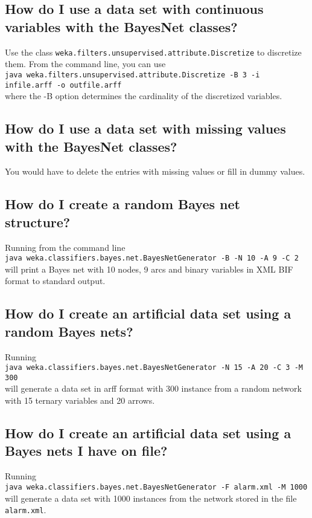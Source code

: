 \documentclass{article}
\begin{document}
\subsection*{How do I use a data set with continuous variables with the BayesNet classes?}
Use the class {\tt weka.filters.unsupervised.attribute.Discretize} to discretize them.
From the command line, you can use\\
{\tt java weka.filters.unsupervised.attribute.Discretize -B 3 -i infile.arff -o outfile.arff}\\
where the -B option determines the cardinality of the discretized variables.

\subsection*{How do I use a data set with missing values with the BayesNet classes?}
You would have to delete the entries with missing values or
fill in dummy values.

\subsection*{How do I create a random Bayes net structure?}

Running from the command line \\
{\tt java  weka.classifiers.bayes.net.BayesNetGenerator -B -N 10 -A 9 -C 2}\\
will print a Bayes net with 10 nodes, 9 arcs and binary variables
in XML BIF format to standard output.

\subsection*{How do I create an artificial data set using a random Bayes nets?}
Running\\
{\tt java  weka.classifiers.bayes.net.BayesNetGenerator -N 15 -A 20 -C 3 -M 300}\\
will generate a data set in arff format with 300 instance from a random
network with 15 ternary variables and 20 arrows.

\subsection*{How do I create an artificial data set using a Bayes nets I have on file?}
Running\\
{\tt java  weka.classifiers.bayes.net.BayesNetGenerator -F alarm.xml -M 1000}\\
will generate a data set with 1000 instances from the network stored in the file
{\tt alarm.xml}.
\end{document}

